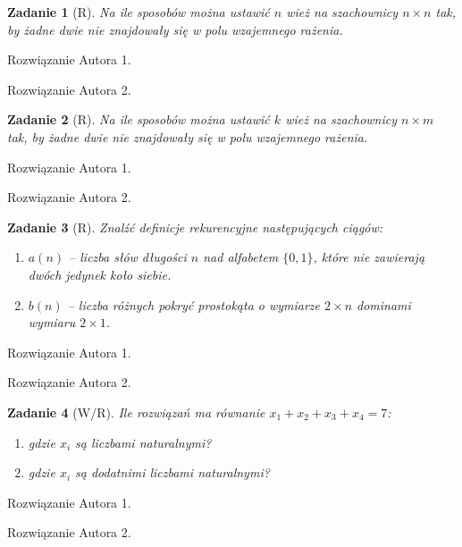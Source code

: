 \documentclass{mwart}
\newtheorem{zad}{Zadanie}[section]
\begin{document}
\begin{zad}[R]
    Na ile sposobów można ustawić $n$ wież na szachownicy
    $n \times n$ tak, by żadne dwie nie znajdowały się w
    polu wzajemnego rażenia.
\end{zad}
\begin{mdframed}
    Rozwiązanie Autora 1.
\end{mdframed}
\begin{mdframed}
    Rozwiązanie Autora 2.
\end{mdframed}




\begin{zad}[R]
    Na ile sposobów można ustawić $k$ wież na szachownicy $n \times m$
    tak, by żadne dwie nie znajdowały się w polu wzajemnego rażenia.
\end{zad}
\begin{mdframed}
    Rozwiązanie Autora 1.
\end{mdframed}
\begin{mdframed}
    Rozwiązanie Autora 2.
\end{mdframed}




\begin{zad}[R]
    Znalźć definicje rekurencyjne następujących ciągów:
    \begin{enumerate}
        \item $a(n)$ -- liczba słów długości $n$ nad alfabetem
              $\{0, 1\}$, które nie zawierają dwóch jedynek koło siebie.
        \item  $b(n)$ -- liczba różnych pokryć prostokąta o wymiarze
              $2 \times n$ dominami wymiaru $2 \times 1$.
    \end{enumerate}
\end{zad}
\begin{mdframed}
    Rozwiązanie Autora 1.
\end{mdframed}
\begin{mdframed}
    Rozwiązanie Autora 2.
\end{mdframed}




\begin{zad}[W/R]
    Ile rozwiązań ma równanie $x_1 + x_2+x_3+x_4 = 7$:
    \begin{enumerate}
        \item gdzie $x_i$ są liczbami naturalnymi?
        \item gdzie $x_i$ są dodatnimi liczbami naturalnymi?
    \end{enumerate}
\end{zad}
\begin{mdframed}
    Rozwiązanie Autora 1.
\end{mdframed}
\begin{mdframed}
    Rozwiązanie Autora 2.
\end{mdframed}
\end{document}
